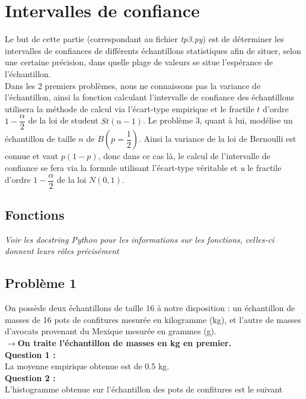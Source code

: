 \documentclass{article}      %
\begin{document}
\section{Intervalles de confiance}
Le but de cette partie (correspondant au fichier \textsl{tp3.py}) est de déterminer les intervalles de confiances de différents échantillons statistiques afin de situer, selon une certaine précision, dans quelle plage de valeurs se situe l'espérance de l'échantillon.\\
Dans les 2 premiers problèmes, nous ne connaissons pas la variance de l'échantillon, ainsi la fonction calculant l'intervalle de confiance des échantillons utilisera la méthode de calcul via l'écart-type empirique et le fractile $t$ d'ordre $1-\dfrac{\alpha}{2}$ de la loi de student $St(n-1)$. Le problème 3, quant à lui, modélise un échantillon de taille $n$ de $B(p = \dfrac{1}{2})$. Ainsi la variance de la loi de Bernoulli est connue et vaut $p(1-p)$, donc dans ce cas là, le calcul de l'intervalle de confiance se fera via la formule utilisant l'écart-type véritable et \textit{u} le fractile d'ordre $1-\dfrac{\alpha}{2}$ de la loi $N(0,1)$.

\subsection{Fonctions}

\textit{Voir les docstring Python pour les informations sur les fonctions, celles-ci donnent leurs rôles précisément}

\subsection{Problème 1}
On possède deux échantillons de taille 16 à notre disposition : un échantillon de masses de 16 pots de confitures mesurée en kilogramme (kg), et l'autre de masses d'avocats provenant du Mexique mesurée en grammes (g).\\
\newline
\textbf{$\rightarrow$On traite l'échantillon de masses en kg en premier.}\\
\newline
\textbf{Question 1 :} \\ La moyenne empirique obtenue est de 0.5 kg.\\
\textbf{Question 2 :} \\ L'histogramme obtenue sur l'échantillon des pots de confitures est le suivant\\
\end{document}
